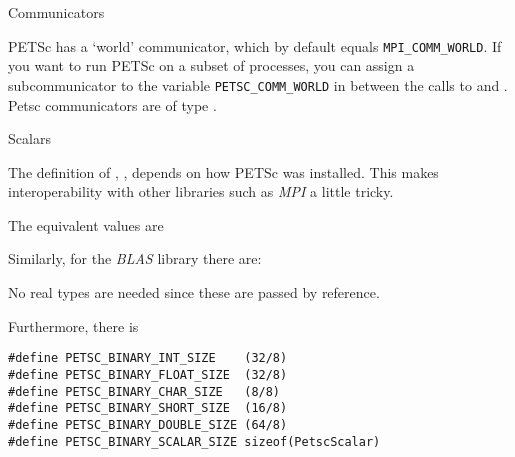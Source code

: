 
 {Communicators}

PETSc has a `world' communicator, which by default equals
\lstinline{MPI_COMM_WORLD}. If you want to run PETSc on a subset of processes,
you can assign a subcommunicator to the variable \lstinline{PETSC_COMM_WORLD}
in between the calls to  and
.
Petsc communicators are of type .

 {Scalars}

The definition of
, , 
depends on how PETSc was installed.
This makes interoperability with other libraries such as
\emph{MPI}%
a little tricky.

The equivalent  values are

Similarly, for the
\emph{BLAS}%
library there  are:
%

No real types are needed since these are passed by reference.

Furthermore, there is
\begin{lstlisting}
#define PETSC_BINARY_INT_SIZE    (32/8)
#define PETSC_BINARY_FLOAT_SIZE  (32/8)
#define PETSC_BINARY_CHAR_SIZE   (8/8)
#define PETSC_BINARY_SHORT_SIZE  (16/8)
#define PETSC_BINARY_DOUBLE_SIZE (64/8)
#define PETSC_BINARY_SCALAR_SIZE sizeof(PetscScalar)  
\end{lstlisting}

\endinput

